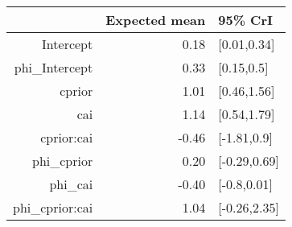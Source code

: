 \begin{tabular}{rrl}
  \hline
 & Expected mean & 95\% CrI \\ 
  \hline
Intercept & 0.18 & [0.01,0.34] \\ 
  phi\_Intercept & 0.33 & [0.15,0.5] \\ 
  cprior & 1.01 & [0.46,1.56] \\ 
  cai & 1.14 & [0.54,1.79] \\ 
  cprior:cai & -0.46 & [-1.81,0.9] \\ 
  phi\_cprior & 0.20 & [-0.29,0.69] \\ 
  phi\_cai & -0.40 & [-0.8,0.01] \\ 
  phi\_cprior:cai & 1.04 & [-0.26,2.35] \\ 
   \hline
\end{tabular}


